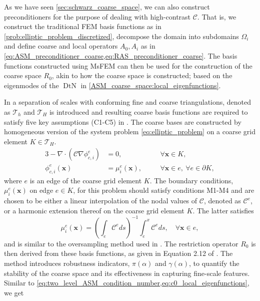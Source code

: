 As we have seen \cref{sec:schwarz_coarse_space}, we can also construct preconditioners for the purpose of dealing with high-contrast $\mathcal{C}$. That is, we construct the traditional FEM basis functions as in \cref{prob:elliptic_problem_discretized}, decompose the domain into subdomains $\Omega_i$ and define coarse and local operators $A_0, A_i$ as in \cref{eq:ASM_preconditioner_coarse,eq:RAS_preconditioner_coarse}. The basis functions constructed using MsFEM can then be used for the construction of the coarse space $R_0$, akin to how the coarse space is constructed; based on the eigenmodes of the $\operatorname{DtN}$ in \cref{ASM_coarse_space:local_eigenfunctions}.

In \cite{msfem_coarse_space_Graham_2007,msfem_for_darcy_Efendiev2011} a separation of scales with conforming fine and coarse triangulations, denoted as $\mathcal{T}_h$ and $\mathcal{T}_H$ is introduced and resulting coarse basis functions are required to satisfy five key assumptions (C1-C5) in \cite[Section 2.2]{msfem_coarse_space_Graham_2007}. The coarse bases are constructed by homogeneous version of the system problem \cref{eq:elliptic_problem} on a coarse grid element $K\in\mathcal{T}_H$.
\begin{alignat}{3}
    -\nabla\cdot(\mathcal{C} \nabla \phi^e_{c,i}) & = 0,                   & \quad & \forall \mathbf{x} \in K,                             \\
    \phi^e_{c,i}(\mathbf{x})                      & = \mu^e_i(\mathbf{x}), & \quad & \forall \mathbf{x} \in e, \ \forall e \in \partial K,
    \label{eq:msfem_coarse_basis}
\end{alignat}
where $e$ is an edge of the coarse grid element $K$. The boundary conditions, $\mu^e_i(\mathbf{x})$ on edge $e\in K$, for this problem should satisfy conditions M1-M4 \cite[Section 4]{msfem_coarse_space_Graham_2007} and are chosen to be either a linear interpolation of the nodal values of $\mathcal{C}$, denoted as $\mathcal{C}^e$, or a harmonic extension thereof on the coarse grid element $K$. The latter satisfies
\begin{equation}
    \mu^e_i(\mathbf{x}) = \left(\int_e \mathcal{C}^e ds\right)^{-1}\int_e^x \mathcal{C}^e ds, \quad \forall \mathbf{x} \in e,
    \label{eq:msfem_harmonic_extension}
\end{equation}
and is similar to the oversampling method used in \cite{og_msfem_Hou1997}. The restriction operator $R_0$ is then derived from these basis functions, as given in Equation 2.12 of \cite{msfem_coarse_space_Graham_2007}. The method introduces robustness indicators, $\pi(\alpha)$ and $\gamma(\alpha)$, to quantify the stability of the coarse space and its effectiveness in capturing fine-scale features. Similar to \cref{eq:two_level_ASM_condition_number,eq:c0_local_eigenfunctions}, we get \cite[Theorem 3.9]{msfem_coarse_space_Graham_2007}
